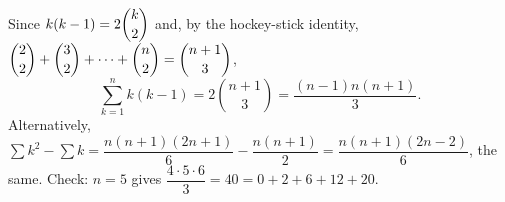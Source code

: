 Since $k(k-1)=2\dbinom k2$ and, by the hockey-stick identity, $\dbinom22+\dbinom32+\cdots+\dbinom n2=\dbinom{n+1}{3}$,
\[
\sum_{k=1}^{n}k(k-1)=2\binom{n+1}{3}=\boxed{\dfrac{(n-1)n(n+1)}{3}}.
\]
Alternatively, $\sum k^2-\sum k=\dfrac{n(n+1)(2n+1)}{6}-\dfrac{n(n+1)}{2}=\dfrac{n(n+1)(2n-2)}{6}$, the same. Check: $n=5$ gives $\dfrac{4\cdot5\cdot6}{3}=40=0+2+6+12+20$.
